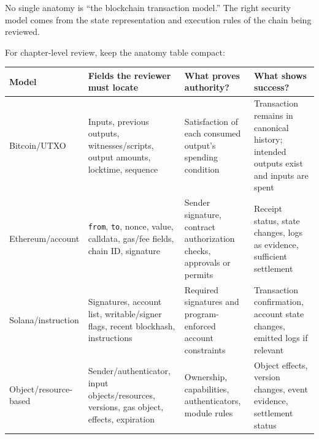 No single anatomy is ``the blockchain transaction model.'' The right
security model comes from the state representation and execution rules
of the chain being reviewed.

For chapter-level review, keep the anatomy table compact:

{\def\LTcaptype{none} %
\begin{longtable}[]{@{}
  >{\raggedright\arraybackslash}p{}
  >{\raggedright\arraybackslash}p{}
  >{\raggedright\arraybackslash}p{}
  >{\raggedright\arraybackslash}p{}@{}}
\toprule\noalign{}
\begin{minipage}[b]{\linewidth}\raggedright
Model
\end{minipage} & \begin{minipage}[b]{\linewidth}\raggedright
Fields the reviewer must locate
\end{minipage} & \begin{minipage}[b]{\linewidth}\raggedright
What proves authority?
\end{minipage} & \begin{minipage}[b]{\linewidth}\raggedright
What shows success?
\end{minipage} \\
\midrule\noalign{}
\endhead
\bottomrule\noalign{}
\endlastfoot
Bitcoin/UTXO & Inputs, previous outputs, witnesses/scripts, output
amounts, locktime, sequence & Satisfaction of each consumed output's
spending condition & Transaction remains in canonical history; intended
outputs exist and inputs are spent \\
Ethereum/account & \passthrough{\lstinline!from!},
\passthrough{\lstinline!to!}, nonce, value, calldata, gas/fee fields,
chain ID, signature & Sender signature, contract authorization checks,
approvals or permits & Receipt status, state changes, logs as evidence,
sufficient settlement \\
Solana/instruction & Signatures, account list, writable/signer flags,
recent blockhash, instructions & Required signatures and
program-enforced account constraints & Transaction confirmation, account
state changes, emitted logs if relevant \\
Object/resource-based & Sender/authenticator, input objects/resources,
versions, gas object, effects, expiration & Ownership, capabilities,
authenticators, module rules & Object effects, version changes, event
evidence, settlement status \\
\end{longtable}
}

